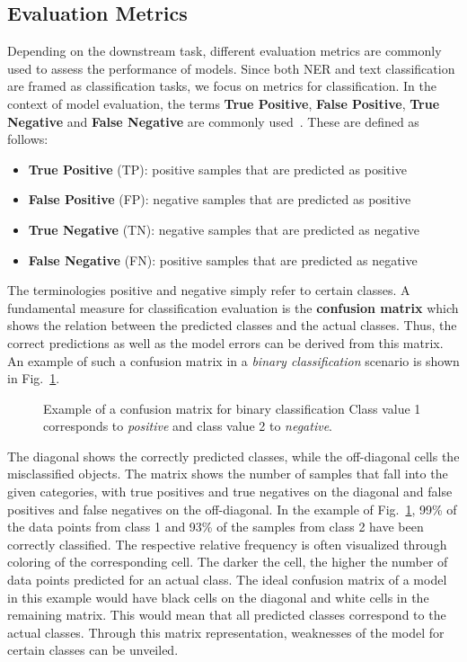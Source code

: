 \subsection{Evaluation Metrics}
Depending on the downstream task, different evaluation metrics are commonly used
to assess the performance of models. Since both NER and text classification are
framed as classification tasks, we focus on metrics for classification. In the
context of model evaluation, the terms \textbf{True Positive}, \textbf{False
Positive}, \textbf{True Negative} and \textbf{False Negative} are commonly
used~\cite{sokolova2009systematic}. These are defined as follows:

\begin{itemize}
    \item \textbf{True Positive} (TP): positive samples that are predicted as
    positive
    \item \textbf{False Positive} (FP): negative samples that are predicted as
    positive
    \item \textbf{True Negative} (TN): negative samples that are predicted as
    negative
    \item \textbf{False Negative} (FN): positive samples that are predicted as
    negative
\end{itemize}

The terminologies positive and negative simply refer to certain classes. A
fundamental measure for classification evaluation is the \textbf{confusion
matrix} which shows the relation between the predicted classes and the actual
classes. Thus, the correct predictions as well as the model errors can be
derived from this matrix. An example of such a confusion matrix in a
\textit{binary classification} scenario is shown in
Fig.~\ref{fig:confusion_matrix}.

\begin{figure}[htbp]
    \centering
    
    \caption[Example of a confusion matrix for binary classification]{Example of
    a confusion matrix for binary classification Class value 1 corresponds to
    \textit{positive} and class value 2 to \textit{negative}.}
    \label{fig:confusion_matrix}
\end{figure}

The diagonal shows the correctly predicted classes, while the off-diagonal cells
the misclassified objects. The matrix shows the number of samples that fall into
the given categories, with true positives and true negatives on the diagonal and
false positives and false negatives on the off-diagonal. In the example of
Fig.~\ref{fig:confusion_matrix}, 99\% of the data points from class 1 and 93\%
of the samples from class 2 have been correctly classified. The respective
relative frequency is often visualized through coloring of the corresponding
cell. The darker the cell, the higher the number of data points predicted for an
actual class. The ideal confusion matrix of a model in this example would have
black cells on the diagonal and white cells in the remaining matrix. This would
mean that all predicted classes correspond to the actual classes. Through this
matrix representation, weaknesses of the model for certain classes can be
unveiled.

